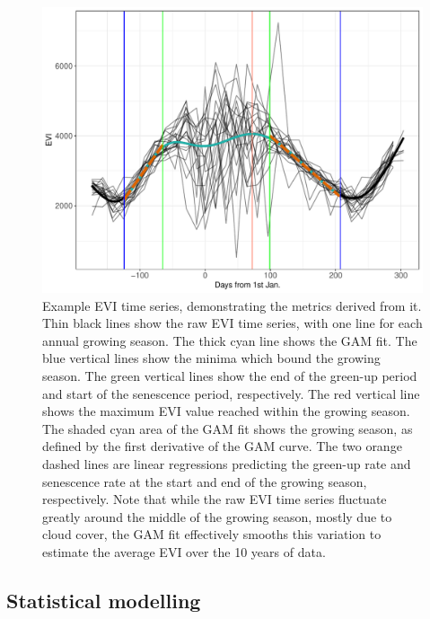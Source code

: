 \begin{refsection}
\begin{figure}
	\includegraphics[width=0.8\linewidth]{img/ts_example}
	\caption[Annotated EVI time series]{Example EVI time series, demonstrating the metrics derived from it. Thin black lines show the raw EVI time series, with one line for each annual growing season. The thick cyan line shows the GAM fit. The blue vertical lines show the minima which bound the growing season. The green vertical lines show the end of the green-up period and start of the senescence period, respectively. The red vertical line shows the maximum EVI value reached within the growing season. The shaded cyan area of the GAM fit shows the growing season, as defined by the first derivative of the GAM curve. The two orange dashed lines are linear regressions predicting the green-up rate and senescence rate at the start and end of the growing season, respectively. Note that while the raw EVI time series fluctuate greatly around the middle of the growing season, mostly due to cloud cover, the GAM fit effectively smooths this variation to estimate the average EVI over the 10 years of data.}
	\label{phen:ts_example}
\end{figure}

\subsection{Statistical modelling}
\label{phen:ssec:models}


\end{refsection}
